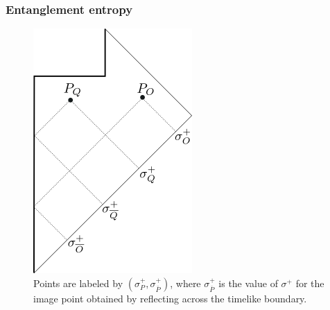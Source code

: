 \documentclass[12pt,oneside,letterpaper]{article}
\numberwithin{equation}{section}
\begin{document}
\subsubsection{Entanglement entropy}


\begin{figure}
\begin{center}
\includegraphics[scale=1.0]{figures/reflect.png}
\end{center}
\caption{\small Points are labeled by $(\sigma^+_P, \sigma^+_{\overline{P}})$, where $\sigma^+_{\overline{P}}$ is the value of $\sigma^+$ for the  image point obtained by reflecting across the timelike boundary.\label{fig:reflect}}
\end{figure}
\end{document}
